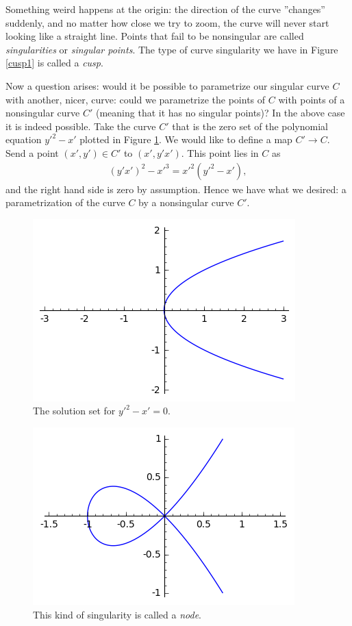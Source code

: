 \documentclass[12pt,a4paper,leqno]{article}
\newcommand{\fref}[1]{\hyperref[{#1}]{\ref*{#1}}}
\theoremstyle{plain}
\theoremstyle{definition}
\theoremstyle{remark}
\begin{document}
Something weird happens at the origin: the direction of the curve ''changes'' suddenly, and no matter how close we try to zoom, the curve will never start looking like a straight line. Points that fail to be nonsingular are called \emph{singularities} or \emph{singular points}. The type of curve singularity we have in Figure \fref{cusp1} is called a \emph{cusp}.

Now a question arises: would it be possible to parametrize our singular curve $C$ with another, nicer, curve: could we parametrize the points of $C$ with points of a nonsingular curve $C'$ (meaning that it has no singular points)? In the above case it is indeed possible. Take the curve $C'$ that is the zero set of the polynomial equation $y'^2 - x'$ plotted in Figure \fref{nsing1}. We would like to define a map $C' \to C$. Send a point $(x',y') \in C'$ to $(x',y'x')$. This point lies in $C$ as
\begin{align*}
\left( y'x' \right) ^ 2 - x'^3 = x'^2 (y'^2 - x'),
\end{align*}
and the right hand side is zero by assumption. Hence we have what we desired: a parametrization of the curve $C$ by a nonsingular curve $C'$.

\begin{figure}[!htbp]\label{nsing1}
\begin{center}
\includegraphics{pics/parabola.png}
\caption{The solution set for $y'^2 - x' = 0$.}
\end{center}
\end{figure}

\begin{figure}[!htbp]\label{node1}
\begin{center}
\includegraphics{pics/node.png}
\caption{This kind of singularity is called a \emph{node}.}
\end{center}
\end{figure}
\end{document}
